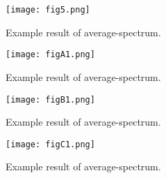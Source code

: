 \documentclass[preprint]{aastex}
\begin{document}
\begin{CJK*}{UTF8}{gbsn}
\clearpage
{}
\begin{figure}
    \centering 
    \texttt{[image: fig5.png]}
    \caption{
    Example result of average-spectrum. 
    }
    \label{figure:5}
\end{figure}



\clearpage
{}
\begin{figure}
    \centering 
    \texttt{[image: figA1.png]}
    \caption{
    Example result of average-spectrum. 
    }
    \label{figure:A1}
\end{figure}

\clearpage
{}
\begin{figure}
    \centering 
    \texttt{[image: figB1.png]}
    \caption{
    Example result of average-spectrum. 
    }
    \label{figure:B1}
\end{figure}

\clearpage
{}
\begin{figure}
    \centering 
    \texttt{[image: figC1.png]}
    \caption{
    Example result of average-spectrum. 
    }
    \label{figure:C1}
\end{figure}


\end{CJK*}

\clearpage 


\clearpage 

\end{document}
